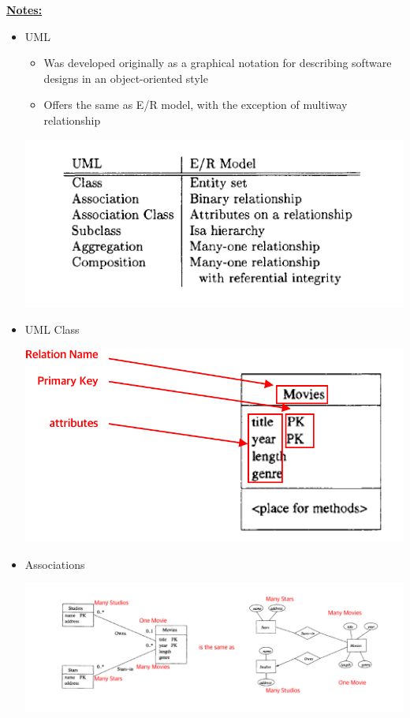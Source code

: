 \documentclass[12pt]{article}
\begin{document}
\begin{enumerate}[1.]
\begin{itemize}
    \end{itemize}

    \bigskip

    \underline{\textbf{Notes:}}

    \bigskip

    \begin{itemize}
        \item UML
        \begin{itemize}
            \item Was developed originally as a graphical notation for describing software designs in an object-oriented style
            \item Offers the same as E/R model, with the exception of multiway relationship
        \end{itemize}

        \begin{center}
        \includegraphics[width=0.7\linewidth]{images/worksheet_15_solution_1.png}
        \end{center}

        \item UML Class

        \begin{center}
        \includegraphics[width=0.5\linewidth]{images/worksheet_15_solution_2.png}
        \end{center}

        \item Associations

        \begin{center}
        \includegraphics[width=\linewidth]{images/worksheet_15_solution_4.png}
        \end{center}


\end{itemize}
\end{enumerate}
\end{document}
